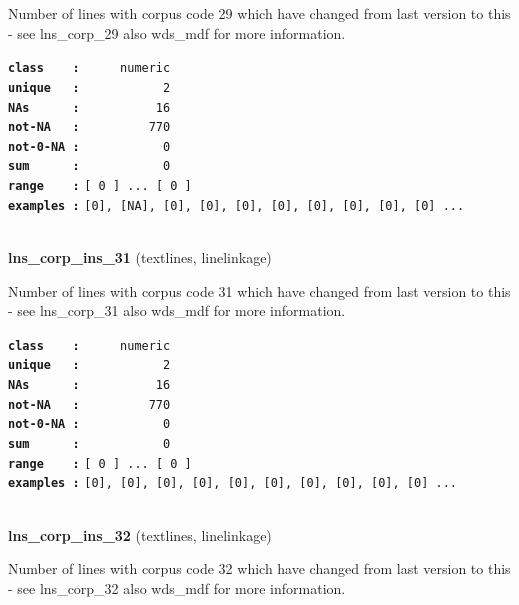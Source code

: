 \documentclass[]{article}
\begin{document}
Number of lines with corpus code 29 which have changed from last version
to this - see lns\_corp\_29 also wds\_mdf for more information.

\textbf{\texttt{class\ \ \ \ :}} \texttt{~~~~~numeric}\\
\textbf{\texttt{unique\ \ \ :}} \texttt{~~~~~~~~~~~2}\\
\textbf{\texttt{NAs\ \ \ \ \ \ :}} \texttt{~~~~~~~~~~16}\\
\textbf{\texttt{not-NA\ \ \ :}} \texttt{~~~~~~~~~770}\\
\textbf{\texttt{not-0-NA\ :}} \texttt{~~~~~~~~~~~0}\\
\textbf{\texttt{sum\ \ \ \ \ \ :}} \texttt{~~~~~~~~~~~0}\\
\textbf{\texttt{range\ \ \ \ :}}
\texttt{{[}\ 0\ {]}\ ...\ {[}\ 0\ {]}}\\
\textbf{\texttt{examples\ :}}
\texttt{{[}0{]},\ {[}NA{]},\ {[}0{]},\ {[}0{]},\ {[}0{]},\ {[}0{]},\ {[}0{]},\ {[}0{]},\ {[}0{]},\ {[}0{]}\ ...}\\

~

\textbf{lns\_corp\_ins\_31} (textlines, linelinkage)

Number of lines with corpus code 31 which have changed from last version
to this - see lns\_corp\_31 also wds\_mdf for more information.

\textbf{\texttt{class\ \ \ \ :}} \texttt{~~~~~numeric}\\
\textbf{\texttt{unique\ \ \ :}} \texttt{~~~~~~~~~~~2}\\
\textbf{\texttt{NAs\ \ \ \ \ \ :}} \texttt{~~~~~~~~~~16}\\
\textbf{\texttt{not-NA\ \ \ :}} \texttt{~~~~~~~~~770}\\
\textbf{\texttt{not-0-NA\ :}} \texttt{~~~~~~~~~~~0}\\
\textbf{\texttt{sum\ \ \ \ \ \ :}} \texttt{~~~~~~~~~~~0}\\
\textbf{\texttt{range\ \ \ \ :}}
\texttt{{[}\ 0\ {]}\ ...\ {[}\ 0\ {]}}\\
\textbf{\texttt{examples\ :}}
\texttt{{[}0{]},\ {[}0{]},\ {[}0{]},\ {[}0{]},\ {[}0{]},\ {[}0{]},\ {[}0{]},\ {[}0{]},\ {[}0{]},\ {[}0{]}\ ...}\\

~

\textbf{lns\_corp\_ins\_32} (textlines, linelinkage)

Number of lines with corpus code 32 which have changed from last version
to this - see lns\_corp\_32 also wds\_mdf for more information.
\end{document}
